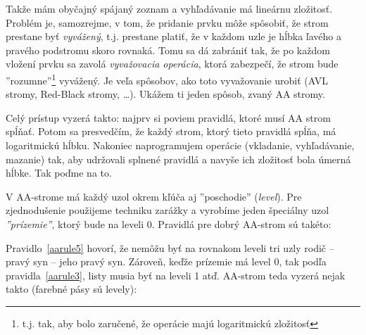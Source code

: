 Takže mám obyčajný spájaný zoznam a vyhľadávanie má lineárnu zložitosť.
Problém je, samozrejme, v tom, že pridanie prvku môže spôsobiť, že strom 
prestane byť {\em vyvážený}, t.j. prestane platiť, že v každom uzle je hĺbka
ľavého a pravého podstromu skoro rovnaká. Tomu sa dá zabrániť tak, že po 
každom vložení prvku sa zavolá {\em vyvažovacia operácia}, ktorá zabezpečí, 
že strom bude ''rozumne''\footnote{%
t.j. tak, aby bolo zaručené, že operácie majú logaritmickú zložitosť}
vyvážený. Je veľa spôsobov, ako toto vyvažovanie urobiť (AVL stromy, Red-Black stromy,
\ldots). Ukážem ti jeden spôsob, zvaný AA stromy. 


Celý prístup vyzerá takto: najprv si poviem pravidlá, ktoré musí AA strom spĺňať. Potom
sa presvedčím, že každý strom, ktorý tieto pravidlá spĺňa, má logaritmickú hĺbku. Nakoniec
naprogramujem operácie (vkladanie, vyhľadávanie, mazanie) tak, aby udržovali splnené pravidlá
a navyše ich zložitosť bola úmerná hĺbke. Tak poďme na to.


V AA-strome má každý uzol okrem kľúča aj ''poschodie'' ({\em level}). Pre zjednodušenie
použijeme techniku zarážky a vyrobíme jeden špeciálny uzol {\em ''prízemie''}, ktorý bude na 
leveli 0. Pravidlá pre dobrý AA-strom sú takéto:\\



\centerline{}

 Pravidlo~\ref{aarule5} hovorí, že nemôžu byť na rovnakom leveli tri uzly
rodič -- pravý syn -- jeho pravý syn. Zároveň, keďže prízemie má level 0, tak
podľa pravidla~\ref{aarule3}, listy musia byť na leveli 1 atď. AA-strom teda vyzerá nejak 
takto (farebné pásy sú levely):\\


